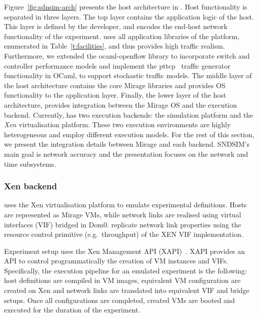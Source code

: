 Figure~\ref{fig:sdnsim-arch} presents the host architecture in \sdnsim. Host
functionality is separated in three layers.  The top layer contains the
application logic of the host. This layer is defined by the developer, and
encodes the end-host network functionality of the experiment. \sdnsim uses all
application libraries of the \mirage platform, enumerated in
Table~\ref{t:facilities}, and thus provides high traffic realism.  Furthermore,
we extended the ocaml-openflow library to incorporate switch and controller
performance models and implement the pttcp~ traffic generator
functionality in OCaml, to support stochastic traffic models.  The middle layer
of the host architecture contains the core Mirage libraries and provides OS
functionality to the application layer. Finally, the lower layer of the host
architecture, provides integration between the Mirage OS and the execution
backend.  Currently, \sdnsim has two execution backends: the
\textit{} simulation platform  and the \textit{Xen} virtualisation
platform. These two execution environments are highly heterogeneous and employ
different execution models. For the rest of this section, we present the
integration details between Mirage and each backend.  SNDSIM's main goal
is network accuracy and the presentation focuses on the network and time
subsystems.

\subsubsection{Xen backend} \label{sec:sdnsim:xen-backend}

\sdnsim uses the Xen virtualisation platform to emulate experimental
definitions. Hosts are represented as Mirage VMs, while network links are
realised using virtual interfaces (VIF) bridged in Dom0. \sdnsim replicate
network link properties using the resource control primitive (e.g.~throughput)
of the XEN VIF implementation.

Experiment setup uses the Xen Management API (XAPI)~.
XAPI provides an API to control programmatically the
creation of VM instances and VIFs. Specifically, the execution pipeline for an
emulated experiment is the following: host definitions are compiled in VM
images, equivalent VM configuration are created on Xen and network links are
translated into equivalent VIF and bridge setups. Once all configurations are
completed, created VMs are booted and executed for the duration of the experiment.

